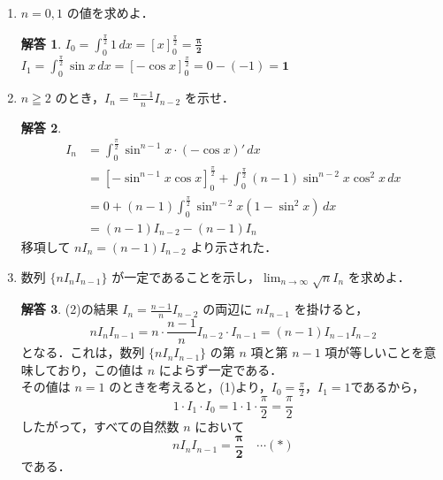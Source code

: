 \documentclass[dvipdfmx]{jlreq}
\theoremstyle{definition}
\newtheorem*{solution}{解答}
\begin{document}
\begin{enumerate}[label=(\arabic*)]
    \item $n=0, 1$ の値を求めよ．
    \begin{solution}
    $\displaystyle I_0 = \int_0^{\frac{\pi}{2}} 1 \, dx = [x]_0^{\frac{\pi}{2}} = \bm{\frac{\pi}{2}}$ \\
    $\displaystyle I_1 = \int_0^{\frac{\pi}{2}} \sin x \, dx = [-\cos x]_0^{\frac{\pi}{2}} = 0 - (-1) = \bm{1}$
    \end{solution}

    \item $n \geqq 2$ のとき，$I_n = \frac{n-1}{n} I_{n-2}$ を示せ．
    \begin{solution}
    \begin{align*}
        I_n &= \int_0^{\frac{\pi}{2}} \sin^{n-1}x \cdot (-\cos x)' \, dx \\
        &= [-\sin^{n-1}x \cos x]_0^{\frac{\pi}{2}} + \int_0^{\frac{\pi}{2}} (n-1)\sin^{n-2}x \cos^2 x \, dx \\
        &= 0 + (n-1) \int_0^{\frac{\pi}{2}} \sin^{n-2}x (1-\sin^2 x) \, dx \\
        &= (n-1) I_{n-2} - (n-1) I_n
    \end{align*}
    移項して $n I_n = (n-1) I_{n-2}$ より示された．
    \end{solution}

    \item 数列 $\{n I_n I_{n-1}\}$ が一定であることを示し，$\lim_{n \to \infty} \sqrt{n}I_n$ を求めよ．
    \begin{solution}
    (2)の結果 $I_n = \frac{n-1}{n} I_{n-2}$ の両辺に $n I_{n-1}$ を掛けると，
    \[n I_n I_{n-1} = n \cdot \frac{n-1}{n} I_{n-2} \cdot I_{n-1} = (n-1) I_{n-1} I_{n-2}\]
    となる．これは，数列 $\{ n I_n I_{n-1} \}$ の第 $n$ 項と第 $n-1$ 項が等しいことを意味しており，この値は $n$ によらず一定である．\\
    その値は $n=1$ のときを考えると，(1)より，$\displaystyle I_0=\frac{\pi}{2}，I_1=1$であるから，
    \[1 \cdot I_1 \cdot I_0 = 1 \cdot 1 \cdot \frac{\pi}{2} = \frac{\pi}{2}\]
    したがって，すべての自然数 $n$ において
    \[n I_n I_{n-1} = \bm{\frac{\pi}{2}} \quad \cdots (\ast)\]
    である．


\end{solution}
\end{enumerate}
\end{document}
